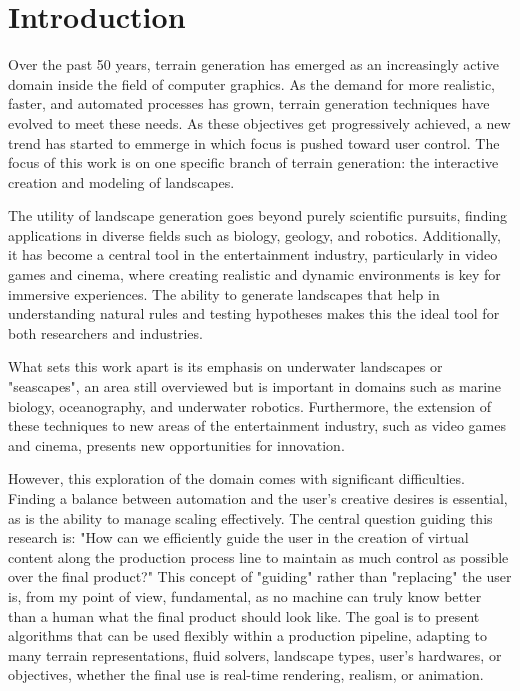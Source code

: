 \chapter{Introduction}
\label{chap:introduction}


Over the past 50 years, terrain generation has emerged as an increasingly active domain inside the field of computer graphics. As the demand for more realistic, faster, and automated processes has grown, terrain generation techniques have evolved to meet these needs. As these objectives get progressively achieved, a new trend has started to emmerge in which focus is pushed toward user control. The focus of this work is on one specific branch of terrain generation: the interactive creation and modeling of landscapes.

The utility of landscape generation goes beyond purely scientific pursuits, finding applications in diverse fields such as biology, geology, and robotics. Additionally, it has become a central tool in the entertainment industry, particularly in video games and cinema, where creating realistic and dynamic environments is key for immersive experiences. The ability to generate landscapes that help in understanding natural rules and testing hypotheses makes this the ideal tool for both researchers and industries.

What sets this work apart is its emphasis on underwater landscapes or "seascapes", an area still overviewed but is important in domains such as marine biology, oceanography, and underwater robotics. Furthermore, the extension of these techniques to new areas of the entertainment industry, such as video games and cinema, presents new opportunities for innovation.

However, this exploration of the domain comes with significant difficulties. Finding a balance between automation and the user's creative desires is essential, as is the ability to manage scaling effectively. 
The central question guiding this research is: "How can we efficiently guide the user in the creation of virtual content along the production process line to maintain as much control as possible over the final product?" This concept of "guiding" rather than "replacing" the user is, from my point of view, fundamental, as no machine can truly know better than a human what the final product should look like. The goal is to present algorithms that can be used flexibly within a production pipeline, adapting to many terrain representations, fluid solvers, landscape types, user's hardwares, or objectives, whether the final use is real-time rendering, realism, or animation.

